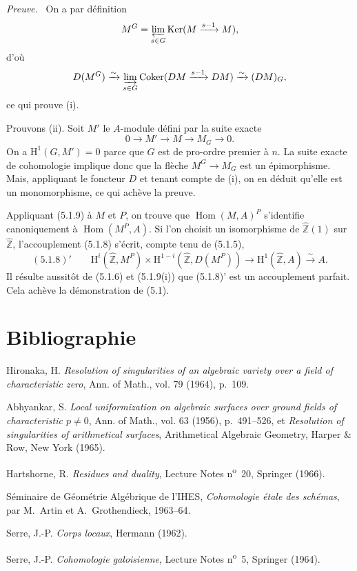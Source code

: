 \documentclass[11pt]{article}
\newenvironment{prooftext}[1][Proof]{\par\noindent\emph{#1.}\ }{\par\medskip}
\renewcommand{\H}{\mathrm{H}}
\DeclareMathOperator{\Hom}{Hom}
\newcommand{\Z}{\mathbb{Z}}
\providecommand{\Ker}{\operatorname{Ker}}
\providecommand{\Coker}{\operatorname{Coker}}
\providecommand{\Hom}{\operatorname{Hom}}
\providecommand{\Ker}{\operatorname{Ker}}
\providecommand{\Coker}{\operatorname{Coker}}
\providecommand{\Ker}{\operatorname{Ker}}
\providecommand{\Coker}{\operatorname{Coker}}
\providecommand{\Z}{\mathbb Z}
\providecommand{\Hom}{\operatorname{Hom}}
\begin{document}
\begin{prooftext}[Preuve]
On a par définition
\[
M^G=\varprojlim_{s\in G}\Ker(M\xrightarrow{s-1}M),
\]
d'où
\[
D(M^G)\xrightarrow{\sim}\varinjlim_{s\in G}\Coker(DM\xrightarrow{s-1}DM)\xrightarrow{\sim}(DM)_G,
\]
ce qui prouve (i).

Prouvons (ii). Soit $M'$ le $A$-module défini par la suite exacte
\[
0\longrightarrow M'\longrightarrow M\longrightarrow M_G\longrightarrow0.
\]
On a $\H^1(G,M')=0$ parce que $G$ est de pro-ordre premier à $n$. La suite exacte de cohomologie implique donc que la flèche $M^G\to M_G$ est un épimorphisme. Mais, appliquant le foncteur $D$ et tenant compte de (i), on en déduit qu'elle est un monomorphisme, ce qui achève la preuve.
\end{prooftext}

Appliquant (5.1.9) à $M$ et $P$, on trouve que $\Hom(M,A)^P$ s'identifie canoniquement à $\Hom(M^P,A)$. Si l'on choisit un isomorphisme de $\widehat{\Z}(1)$ sur $\widehat{\Z}$, l'accouplement (5.1.8) s'écrit, compte tenu de (5.1.5),
\[
(5.1.8)'\qquad \H^i(\widehat{\Z},M^P)\times\H^{1-i}(\widehat{\Z},D(M^P))\longrightarrow\H^1(\widehat{\Z},A)\xrightarrow{\sim}A.
\]
Il résulte aussitôt de (5.1.6) et (5.1.9(i)) que (5.1.8)' est un accouplement parfait. Cela achève la démonstration de (5.1).

\section*{Bibliographie}

\begin{description}[leftmargin=2.5cm,style=nextline]
\item[{[2]}] Hironaka, H. \emph{Resolution of singularities of an algebraic variety over a field of characteristic zero}, Ann. of Math., vol. 79 (1964), p.~109.
\item[{[1]}] Abhyankar, S. \emph{Local uniformization on algebraic surfaces over ground fields of characteristic $p\ne0$}, Ann. of Math., vol. 63 (1956), p.~491--526, et \emph{Resolution of singularities of arithmetical surfaces}, Arithmetical Algebraic Geometry, Harper \& Row, New York (1965).
\item[{[H]}] Hartshorne, R. \emph{Residues and duality}, Lecture Notes n\textsuperscript{o}~20, Springer (1966).
\item[{[SGA]}] Séminaire de Géométrie Algébrique de l'IHES, \emph{Cohomologie étale des schémas}, par M.~Artin et A.~Grothendieck, 1963--64.
\item[{[CL]}] Serre, J.-P. \emph{Corps locaux}, Hermann (1962).
\item[{[CG]}] Serre, J.-P. \emph{Cohomologie galoisienne}, Lecture Notes n\textsuperscript{o}~5, Springer (1964).
\end{description}
\end{document}
